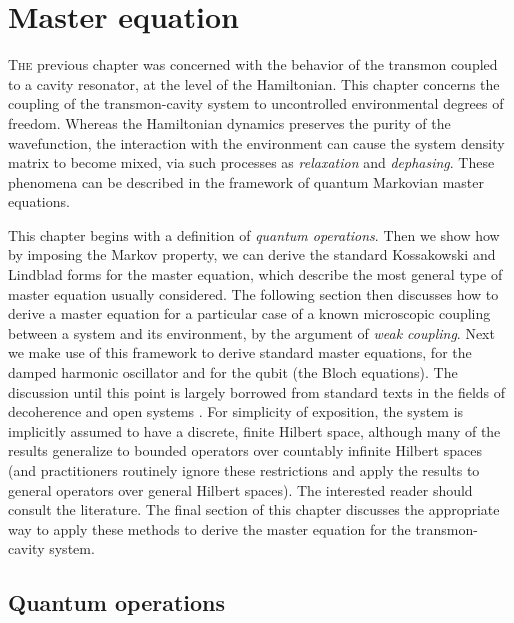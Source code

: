 %
\chapter{Master equation}\label{ch:master}%
%
%
\lettrine{T}{he} previous chapter was concerned with the behavior of the transmon coupled to a cavity resonator, at the level of the Hamiltonian. This chapter concerns the coupling of the transmon-cavity system to uncontrolled environmental degrees of freedom. Whereas the Hamiltonian dynamics preserves the purity of the wavefunction, the interaction with the environment can cause the system density matrix to become mixed, via such processes as \emph{relaxation} and \emph{dephasing}. These phenomena can be described in the framework of quantum Markovian master equations.

This chapter begins with a definition of \emph{quantum operations}. Then we show how by imposing the Markov property, we can derive the standard Kossakowski and Lindblad forms for the master equation, which describe the most general type of master equation usually considered. The following section then discusses how to derive a master equation for a particular case of a known microscopic coupling between a system and its environment, by the argument of \emph{weak coupling}. Next we make use of this framework to derive standard master equations, for the damped harmonic oscillator and for the qubit (the Bloch equations). The discussion until this point is largely borrowed from standard texts in the fields of decoherence and open systems \cite{hornberger_decoherence_2009, alicki_lendi, breuer_petruccione}. For simplicity of exposition, the system is implicitly assumed to have a discrete, finite Hilbert space, although many of the results generalize to bounded operators over countably infinite Hilbert spaces (and practitioners routinely ignore these restrictions and apply the results to general operators over general Hilbert spaces). The interested reader should consult the literature. The final section of this chapter discusses the appropriate way to apply these methods to derive the master equation for the transmon-cavity system.

\section{Quantum operations}
\label{sec:positive}

